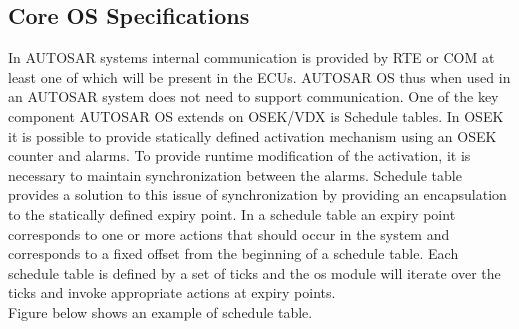 \subsection{Core OS Specifications}
In AUTOSAR systems internal communication is provided by RTE or COM at least one of which will be present in the ECUs.
AUTOSAR OS thus when used in an AUTOSAR system does not need to support communication.
One of the key component AUTOSAR OS extends on OSEK/VDX is Schedule tables.
In OSEK it is possible to provide statically defined activation mechanism using an OSEK counter and alarms. To provide runtime modification of the activation, it is necessary to maintain synchronization between the alarms.
Schedule table provides a solution to this issue of synchronization by providing an encapsulation to the statically defined expiry point.
In a schedule table an expiry point corresponds to one or more actions that should occur in the system and corresponds to a fixed offset from the beginning of a schedule table.
Each schedule table is defined by a set of ticks and the os module will iterate over the ticks and invoke appropriate actions at expiry points. \\Figure below shows an example of schedule table.\\
\noindent%
\begin{minipage}{\linewidth}%
\end{minipage}
